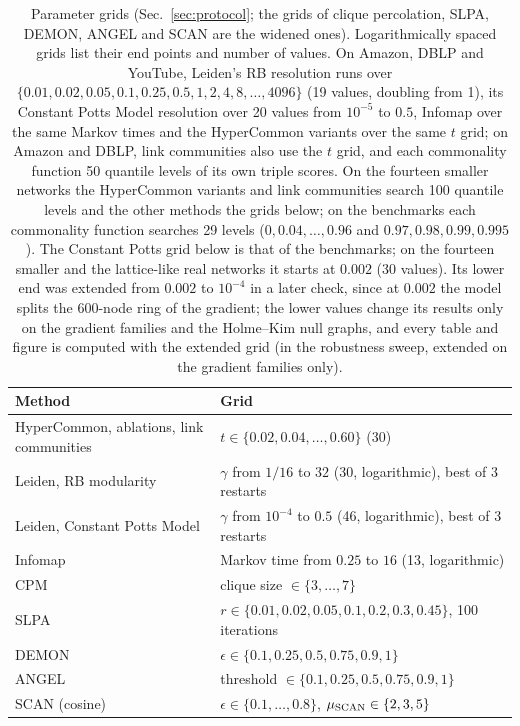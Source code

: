 \begin{table}[tbp]
\caption{Parameter grids (Sec.~\ref{sec:protocol}; the grids of clique percolation,
SLPA, DEMON, ANGEL and SCAN are the widened ones).
Logarithmically spaced grids list their end points and number of values. On Amazon,
DBLP and YouTube, Leiden's RB resolution runs over $\{0.01, 0.02, 0.05, 0.1, 0.25, 0.5,
1, 2, 4, 8, \dots, 4096\}$ (19 values, doubling from 1), its Constant Potts Model
resolution over 20 values from $10^{-5}$ to $0.5$, Infomap over the same Markov times
and the HyperCommon variants over the same $t$ grid; on Amazon and DBLP, link
communities also use the $t$ grid, and each commonality function 50 quantile levels of
its own triple scores. On the fourteen smaller networks the HyperCommon variants and
link communities search 100 quantile levels and the other methods the grids below; on
the benchmarks each commonality function searches 29 levels ($0,0.04,\dots,0.96$ and
$0.97,0.98,0.99,0.995$). The Constant Potts grid below is that of the benchmarks; on the fourteen smaller and the lattice-like real networks it starts at $0.002$ (30 values). Its lower end was extended from $0.002$ to $10^{-4}$ in a later check, since at $0.002$ the model splits the 600-node ring of the gradient; the lower values change its results only on the gradient families and the Holme--Kim null graphs, and every table and figure is computed with the extended grid (in the robustness sweep, extended on the gradient families only).}
\label{tab:grids}
\begin{ruledtabular}
\begin{tabular}{ll}
Method & Grid \\
\hline
HyperCommon, ablations, link communities & $t\in\{0.02,0.04,\dots,0.60\}$ (30) \\
Leiden, RB modularity & $\gamma$ from $1/16$ to $32$ (30, logarithmic), best of 3 restarts \\
Leiden, Constant Potts Model & $\gamma$ from $10^{-4}$ to $0.5$ (46, logarithmic), best of 3 restarts \\
Infomap & Markov time from $0.25$ to $16$ (13, logarithmic) \\
CPM & clique size $\in\{3,\dots,7\}$ \\
SLPA & $r\in\{0.01,0.02,0.05,0.1,0.2,0.3,0.45\}$, 100 iterations \\
DEMON & $\epsilon\in\{0.1,0.25,0.5,0.75,0.9,1\}$ \\
ANGEL & threshold $\in\{0.1,0.25,0.5,0.75,0.9,1\}$ \\
SCAN (cosine) & $\epsilon\in\{0.1,\dots,0.8\}$, $\mu_{\rm SCAN}\in\{2,3,5\}$ \\

\end{tabular}
\end{ruledtabular}
\end{table}
